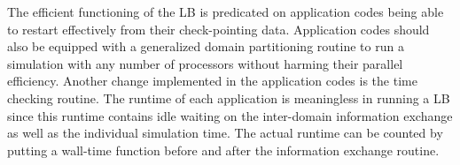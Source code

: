 \documentclass[preprint,12pt]{elsarticle}
\begin{document}

The efficient functioning of the LB is predicated on application codes being able to restart effectively from their check-pointing data. Application codes should also be equipped with a generalized domain partitioning routine to run a simulation with any number of processors without harming their parallel efficiency. Another change implemented in the application codes is the time checking routine. The runtime of each application is meaningless in running a LB since this runtime contains idle waiting on the inter-domain information exchange as well as the individual simulation time. The actual runtime can be counted by putting a wall-time function before and after the information exchange routine.
\end{document}
